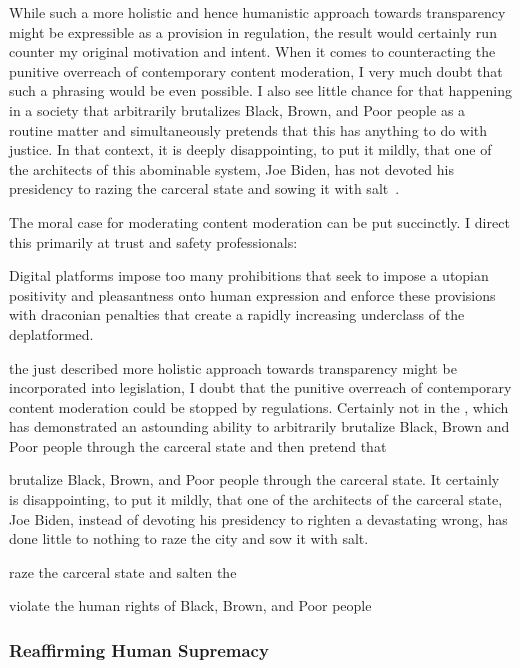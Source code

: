While such a more holistic and hence humanistic approach towards transparency
might be expressible as a provision in regulation, the result would certainly
run counter my original motivation and intent. When it comes to counteracting
the punitive overreach of contemporary content moderation, I very much doubt
that such a phrasing would be even possible. I also see little chance for that
happening in a society that arbitrarily brutalizes Black, Brown, and Poor people
as a routine matter and simultaneously pretends that this has anything to do
with justice. In that context, it is deeply disappointing, to put it mildly,
that one of the architects of this abominable system, Joe Biden, has not devoted
his presidency to razing the carceral state and sowing it with
salt~\cite{Reinhart2022,StolbergHerndon2019}.

The moral case for moderating content moderation can be put succinctly. I direct
this primarily at trust and safety professionals:

Digital platforms impose too many prohibitions that seek to impose a utopian
positivity and pleasantness onto human expression and enforce these provisions
with draconian penalties that create a rapidly increasing underclass of the
deplatformed.


the just described more holistic approach towards transparency might be
incorporated into legislation, I doubt that the punitive overreach of
contemporary content moderation could be stopped by regulations. Certainly not
in the \US, which has demonstrated an astounding ability to arbitrarily
brutalize Black, Brown and Poor people through the carceral state and then
pretend that



brutalize Black, Brown, and Poor people through the carceral state. It certainly
is disappointing, to put it mildly, that one of the architects of the carceral
state, Joe Biden, instead of devoting his presidency to righten a devastating
wrong, has done little to nothing to raze the city and sow it with salt.


raze the carceral state and salten the



violate
the human rights of Black, Brown, and Poor people



\subsubsection{Reaffirming Human Supremacy}

